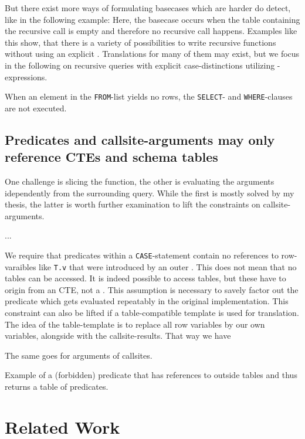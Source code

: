 But there exist more ways of formulating basecases which are harder do detect, like in the following example:
Here, the basecase occurs when the table containing the recursive call is empty and therefore no recursive call happens. Examples like this show, that there is a variety of possibilities to write recursive functions without using an explicit \CASE. Translations for many of them may exist, but we focus in the following on recursive queries with explicit case-distinctions utilizing \CASE-expressions.

When an element in the \texttt{FROM}-list yields no rows, the \texttt{SELECT}- and \texttt{WHERE}-clauses are not executed.

\subsection{Predicates and callsite-arguments may only reference CTEs and schema tables}
One challenge is slicing the function, the other is evaluating the arguments idependently from the surrounding query. While the first is mostly solved by my thesis, the latter is worth further examination to lift the constraints on callsite-arguments.

...

We require that predicates within a \texttt{CASE}-statement contain no references to row-varaibles like \texttt{T.v} that were introduced by an outer \FROM. This does not mean that no tables can be accessed. It is indeed possible to access tables, but these have to origin from an CTE, not a \FROM. This assumption is necessary to savely factor out the predicate which gets evaluated repeatably in the original implementation. This constraint can also be lifted if a table-compatible template is used for translation. The idea of the table-template is to replace all row variables by our own variables, alongside with the callsite-results. That way we have 

The same goes for arguments of callsites.

\begin{listing}[ht]
\caption{Example of a (forbidden) predicate that has references to outside tables and thus returns a table of predicates.}
\label{lst:from_nonselfcontained}
\end{listing}

\section{Related Work}